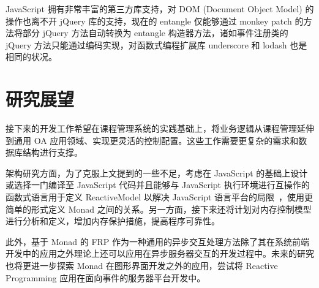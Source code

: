 JavaScript 拥有非常丰富的第三方库支持，对 DOM (Document Object Model) 的操作也离不开 jQuery 库的支持，现在的 entangle 仅能够通过 monkey patch 的方法将部分 jQuery 方法自动转换为 entangle 构造器方法，诸如事件注册类的 jQuery 方法只能通过编码实现，对函数式编程扩展库 underscore 和 lodash 也是相同的状况。

\section{研究展望}

接下来的开发工作希望在课程管理系统的实践基础上，将业务逻辑从课程管理延伸到通用 OA 应用领域、实现更灵活的控制配置。这些工作需要更复杂的需求和数据库结构进行支撑。

架构研究方面，为了克服上文提到的一些不足，考虑在 JavaScript 的基础上设计或选择一门编译至 JavaScript 代码并且能够与 JavaScript 执行环境进行互操作的函数式语言用于定义 ReactiveModel 以解决 JavaScript 语言平台的局限~\cite{Freeman:2012:HLW:2480361.2371413}，使用更简单的形式定义 Monad 之间的关系。另一方面，接下来还将计划对内存控制模型进行分析和定义，增加内存保护措施，提高程序可靠性。

此外，基于 Monad 的 FRP 作为一种通用的异步交互处理方法除了其在系统前端开发中的应用之外理论上还可以应用在异步服务器交互的开发过程中。未来的研究也将更进一步探索 Monad 在图形界面开发之外的应用，尝试将 Reactive Programming 应用在面向事件的服务器平台开发中。

